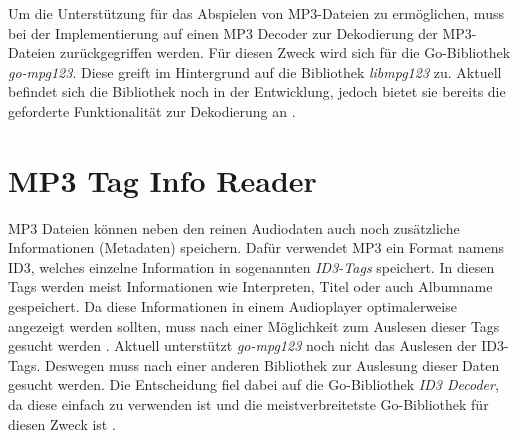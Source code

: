 Um die Unterstützung für das Abspielen von \ac{MP3}-Dateien zu ermöglichen,
muss bei der Implementierung auf einen \ac{MP3} Decoder zur Dekodierung
der \ac{MP3}-Dateien zurückgegriffen werden. Für diesen Zweck wird sich für die
Go-Bibliothek \textit{go-mpg123}. Diese greift im
Hintergrund auf die Bibliothek \textit{libmpg123} zu. Aktuell befindet sich die
Bibliothek noch in der Entwicklung, jedoch bietet sie bereits die
geforderte Funktionalität zur Dekodierung an \autocite{mp3_decoder}.

\section{\acs{MP3} Tag Info Reader}
\ac{MP3} Dateien können neben den reinen Audiodaten auch noch zusätzliche
Informationen (Metadaten) speichern. Dafür verwendet \ac{MP3} ein Format namens
\ac{ID3}, welches einzelne Information in
sogenannten \textit{\ac{ID3}-Tags} speichert. In diesen Tags werden meist
Informationen wie Interpreten, Titel oder auch Albumname gespeichert. Da diese
Informationen in einem Audioplayer optimalerweise angezeigt werden sollten,
muss nach einer Möglichkeit zum Auslesen dieser Tags gesucht werden \autocite{id3}. \hfill
\break
Aktuell unterstützt \textit{go-mpg123} noch nicht das Auslesen der \ac{ID3}-Tags.
Deswegen muss nach einer anderen Bibliothek zur Auslesung dieser Daten gesucht
werden. Die Entscheidung fiel dabei auf die Go-Bibliothek \textit{ID3 Decoder},
da diese einfach zu verwenden ist und die meistverbreitetste Go-Bibliothek
für diesen Zweck ist \autocite{id3_go_2015}.
